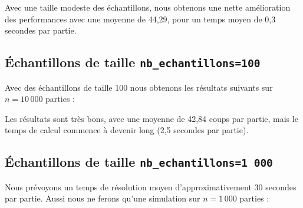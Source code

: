 Avec une taille modeste des échantillons, nous obtenons une nette amélioration des performances avec une moyenne de 44,29,  pour un temps moyen de 0,3 secondes par partie.
 
\newpage
\subsection{Échantillons de taille \texttt{nb\_echantillons=100}}
Avec des échantillons de taille 100 nous obtenons les résultats suivants sur $n=10\,000$ parties :

\begin{center}
\end{center}
 
Les résultats sont très bons, avec une moyenne de 42,84 coups par partie, mais le temps de calcul commence à devenir long (2,5 secondes par partie). 

\newpage
\subsection{Échantillons de taille \texttt{nb\_echantillons=1\,000}}
Nous prévoyons un temps de résolution moyen d'approximativement 30 secondes par partie. Aussi nous ne ferons qu'une simulation sur $n=1\,000$ parties :

